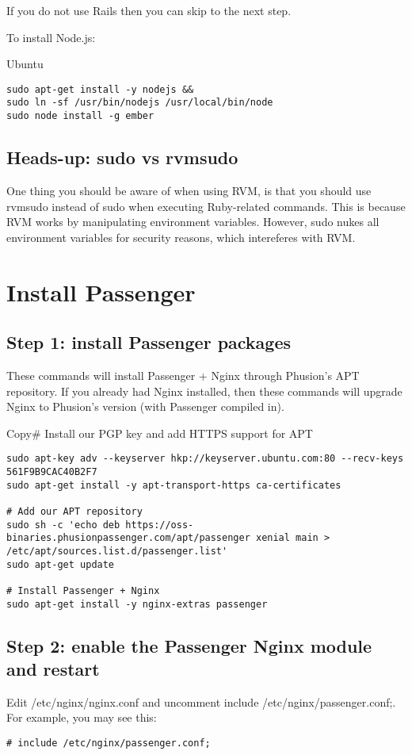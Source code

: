 \documentclass[11pt]{article}
\begin{document}
If you do not use Rails then you can skip to the next step.

To install Node.js:

Ubuntu

\begin{verbatim}
sudo apt-get install -y nodejs &&
sudo ln -sf /usr/bin/nodejs /usr/local/bin/node
sudo node install -g ember
\end{verbatim}

\subsection{Heads-up: sudo vs rvmsudo}
\label{sec:orgcc77c44}

One thing you should be aware of when using RVM, is that you should use rvmsudo instead of sudo when executing Ruby-related commands. This is because RVM works by manipulating environment variables. However, sudo nukes all environment variables for security reasons, which intereferes with RVM.

\section{Install Passenger}
\label{sec:org705b08e}
\subsection{Step 1: install Passenger packages}
\label{sec:org986545f}

These commands will install Passenger + Nginx through Phusion's APT repository. If you already had Nginx installed, then these commands will upgrade Nginx to Phusion's version (with Passenger compiled in).

Copy\# Install our PGP key and add HTTPS support for APT
\begin{verbatim}
sudo apt-key adv --keyserver hkp://keyserver.ubuntu.com:80 --recv-keys 561F9B9CAC40B2F7
sudo apt-get install -y apt-transport-https ca-certificates

# Add our APT repository
sudo sh -c 'echo deb https://oss-binaries.phusionpassenger.com/apt/passenger xenial main > /etc/apt/sources.list.d/passenger.list'
sudo apt-get update

# Install Passenger + Nginx
sudo apt-get install -y nginx-extras passenger
\end{verbatim}
\subsection{Step 2: enable the Passenger Nginx module and restart}
\label{sec:org49856c9}
Edit /etc/nginx/nginx.conf and uncomment include /etc/nginx/passenger.conf;. For example, you may see this:
\begin{verbatim}
# include /etc/nginx/passenger.conf;
\end{verbatim}
\end{document}
